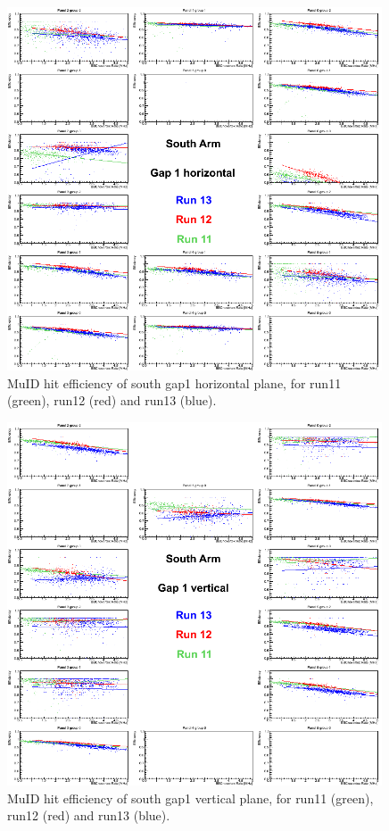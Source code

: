 \begin{figure}[h!]

  \centering
  \includegraphics[width=0.99\textwidth]{./figures/efficomp_South_gap1_horizontal.png}
  \caption{\label{Fig:efficiency:MuIdEff:a0g1p0}MuID hit efficiency of south gap1 horizontal plane, for run11 (green), run12 (red) and run13 (blue).}
\end{figure}
\clearpage


\begin{figure}[h!]

  \centering
  \includegraphics[width=0.99\textwidth]{./figures/efficomp_South_gap1_vertical.png}
  \caption{\label{Fig:efficiency:MuIdEff:a0g1p1}MuID hit efficiency of south gap1 vertical plane, for run11 (green), run12 (red) and run13 (blue).}
\end{figure}
\clearpage


